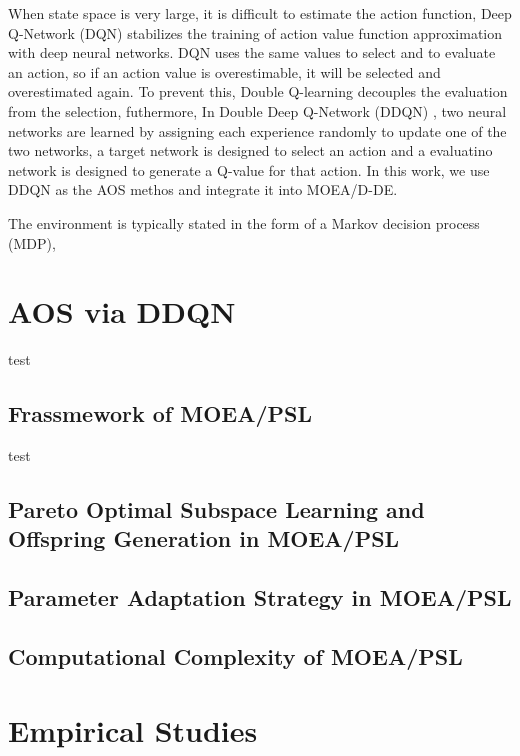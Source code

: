 \documentclass[journal]{IEEEtran}
\begin{document}
When state space is very large, it is difficult to estimate the action function, Deep Q-Network (DQN) \cite{mnih2015human} stabilizes the training of action value function approximation with deep neural networks.
DQN uses the same values to select and to evaluate an action, so if an action value is overestimable, it will be selected and overestimated again. To prevent this, Double Q-learning \cite{hasselt2010double} decouples the evaluation from the selection, futhermore, In Double Deep Q-Network (DDQN) \cite{ddqn}, two neural networks are learned by assigning each experience randomly to update one of the two networks, a target network is designed to select an action and a evaluatino network is designed to generate a Q-value for that action.
In this work, we use DDQN as the AOS methos and integrate it into MOEA/D-DE.



The environment is typically stated in the form of a Markov decision process (MDP),

\section{AOS via DDQN}
test
\subsection{Frassmework of MOEA/PSL}
test
\subsection{Pareto Optimal Subspace Learning and Offspring Generation in MOEA/PSL}

\subsection{Parameter Adaptation Strategy in MOEA/PSL}

\subsection{Computational Complexity of MOEA/PSL}


\section{Empirical Studies}
\end{document}
